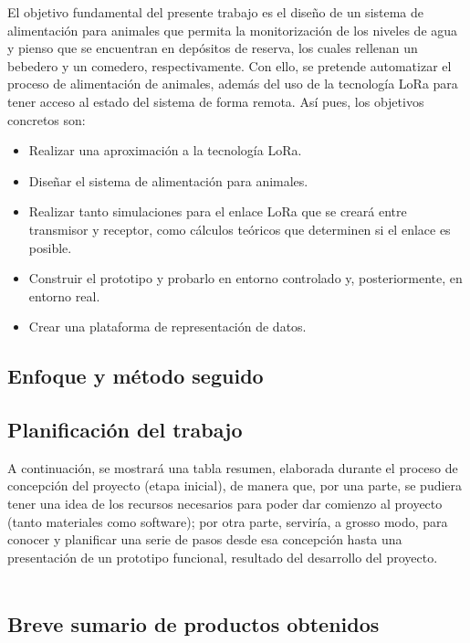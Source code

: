 \documentclass[12pt]{article}
\begin{document}
	El objetivo fundamental del presente trabajo es el diseño de un sistema de alimentación para animales que permita la monitorización de los niveles de agua y pienso que se encuentran en depósitos de reserva, los cuales rellenan un bebedero y un comedero, respectivamente.  Con ello, se pretende automatizar el proceso de alimentación de animales, además del uso de la tecnología LoRa para tener acceso al estado del sistema de forma remota. Así pues, los objetivos concretos son:
	
	\begin{itemize}
		\item Realizar una aproximación a la tecnología LoRa.
		\item Diseñar el sistema de alimentación para animales.
		\item Realizar tanto simulaciones para el enlace LoRa que se creará entre transmisor y receptor, como cálculos teóricos que determinen si el enlace es posible.
		\item Construir el prototipo y probarlo en entorno controlado y, posteriormente, en entorno real.
		\item Crear una plataforma de representación de datos.
	\end{itemize}
	
	\subsection[Enfoque y método seguido]{Enfoque y método seguido}
	\subsection[Planificación del trabajo]{Planificación del trabajo}
	
	\noindent A continuación, se mostrará una tabla resumen, elaborada durante el proceso de concepción del proyecto (etapa inicial), de manera que, por una parte, se pudiera tener una idea de los recursos necesarios para poder dar comienzo al proyecto (tanto materiales como software); por otra parte, serviría, a grosso modo, para conocer y planificar una serie de pasos desde esa concepción hasta una presentación de un prototipo funcional, resultado del desarrollo del proyecto. \\
	
	 \\
	
	\subsection[Breve sumario de productos obtenidos]{Breve sumario de productos obtenidos}
\end{document}
